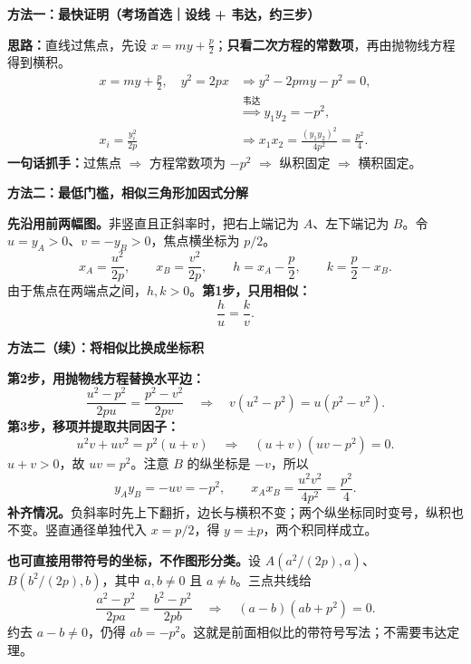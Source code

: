\clearpage
\begin{proofbox}
\textbf{\textcolor{CProof}{方法一：最快证明（考场首选｜设线 + 韦达，约三步）}}\par\smallskip
\begin{center}\end{center}
\textbf{思路：}直线过焦点，先设 $x=my+\frac p2$；\textbf{只看二次方程的常数项}，再由抛物线方程得到横积。
\[
 \begin{aligned}
 x=my+\frac p2,\quad y^2=2px
 &\Longrightarrow y^2-2pmy-p^2=0,\\
 &\overset{\text{韦达}}{\Longrightarrow}
 \boxed{y_1y_2=-p^2},\\[2pt]
 x_i=\frac{y_i^2}{2p}
 &\Longrightarrow
 \boxed{x_1x_2=\frac{(y_1y_2)^2}{4p^2}=\frac{p^2}{4}}.
 \end{aligned}
\]
\textbf{一句话抓手：}过焦点 $\Rightarrow$ 方程常数项为 $-p^2$
$\Rightarrow$ 纵积固定 $\Rightarrow$ 横积固定。
\end{proofbox}
\clearpage
\begin{proofbox}
\textbf{\textcolor{CProof}{方法二：最低门槛，相似三角形加因式分解}}
\begin{center}\end{center}

\textbf{先沿用前两幅图。}非竖直且正斜率时，把右上端记为 $A$、左下端记为 $B$。令 $u=y_A>0$、$v=-y_B>0$，焦点横坐标为 $p/2$。
\[
 x_A=\frac{u^2}{2p},\qquad x_B=\frac{v^2}{2p},\qquad
 h=x_A-\frac p2,\qquad k=\frac p2-x_B.
\]
由于焦点在两端点之间，$h,k>0$。\textbf{第1步，只用相似：}
\[
 \frac hu=\frac kv.
\]
\end{proofbox}
\clearpage
\begin{proofbox}
\textbf{\textcolor{CProof}{方法二（续）：将相似比换成坐标积}}\par\smallskip
\textbf{第2步，用抛物线方程替换水平边：}
\[
 \frac{u^2-p^2}{2pu}=\frac{p^2-v^2}{2pv}
 \quad\Longrightarrow\quad v(u^2-p^2)=u(p^2-v^2).
\]
\textbf{第3步，移项并提取共同因子：}
\[
 u^2v+uv^2=p^2(u+v)
 \quad\Longrightarrow\quad (u+v)(uv-p^2)=0.
\]
$u+v>0$，故 $uv=p^2$。注意 $B$ 的纵坐标是 $-v$，所以
\[
 \boxed{y_Ay_B=-uv=-p^2},\qquad
 \boxed{x_Ax_B=\frac{u^2v^2}{4p^2}=\frac{p^2}{4}}.
\]
\textbf{补齐情况。}负斜率时先上下翻折，边长与横积不变；两个纵坐标同时变号，纵积也不变。竖直通径单独代入 $x=p/2$，得 $y=\pm p$，两个积同样成立。

\medskip
\textbf{也可直接用带符号的坐标，不作图形分类。}设 $A(a^2/(2p),a)$、$B(b^2/(2p),b)$，其中 $a,b\ne0$ 且 $a\ne b$。三点共线给
\[
 \frac{a^2-p^2}{2pa}=\frac{b^2-p^2}{2pb}
 \quad\Longrightarrow\quad (a-b)(ab+p^2)=0.
\]
约去 $a-b\ne0$，仍得 $ab=-p^2$。这就是前面相似比的带符号写法；不需要韦达定理。
\end{proofbox}
